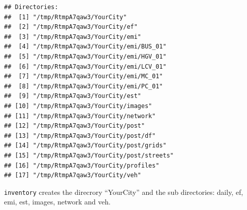 \documentclass[12pt,graybox,envcountchap,sectrefs]{krantz}
\theoremstyle{definition}
\theoremstyle{definition}
\theoremstyle{definition}
\theoremstyle{remark}
\begin{document}
\begin{verbatim}
## Directories:
##  [1] "/tmp/RtmpA7qaw3/YourCity"             
##  [2] "/tmp/RtmpA7qaw3/YourCity/ef"          
##  [3] "/tmp/RtmpA7qaw3/YourCity/emi"         
##  [4] "/tmp/RtmpA7qaw3/YourCity/emi/BUS_01"  
##  [5] "/tmp/RtmpA7qaw3/YourCity/emi/HGV_01"  
##  [6] "/tmp/RtmpA7qaw3/YourCity/emi/LCV_01"  
##  [7] "/tmp/RtmpA7qaw3/YourCity/emi/MC_01"   
##  [8] "/tmp/RtmpA7qaw3/YourCity/emi/PC_01"   
##  [9] "/tmp/RtmpA7qaw3/YourCity/est"         
## [10] "/tmp/RtmpA7qaw3/YourCity/images"      
## [11] "/tmp/RtmpA7qaw3/YourCity/network"     
## [12] "/tmp/RtmpA7qaw3/YourCity/post"        
## [13] "/tmp/RtmpA7qaw3/YourCity/post/df"     
## [14] "/tmp/RtmpA7qaw3/YourCity/post/grids"  
## [15] "/tmp/RtmpA7qaw3/YourCity/post/streets"
## [16] "/tmp/RtmpA7qaw3/YourCity/profiles"    
## [17] "/tmp/RtmpA7qaw3/YourCity/veh"
\end{verbatim}

\texttt{inventory} creates the direcrory ``YourCity'' and the sub
directories: daily, ef, emi, est, images, network and veh.
\end{document}
